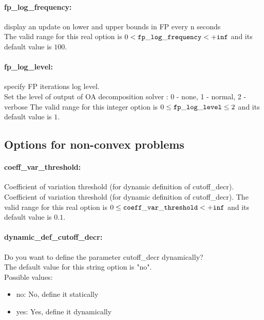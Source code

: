 \paragraph{fp\_log\_frequency:}\label{sec:fp_log_frequency} display an update on lower and upper bounds in FP every n seconds $\;$ \\
 The valid range for this real option is 
$0 <  {\tt fp\_log\_frequency } <  {\tt +inf}$
and its default value is $100$.


\paragraph{fp\_log\_level:}\label{sec:fp_log_level} specify FP iterations log level. $\;$ \\
 Set the level of output of OA decomposition
solver : 0 - none, 1 - normal, 2 - verbose The valid range for this integer option is
$0 \le {\tt fp\_log\_level } \le 2$
and its default value is $1$.


\subsection{Options for non-convex problems}
\label{sec:Options_for_non-convex_problems}
\paragraph{coeff\_var\_threshold:}\label{sec:coeff_var_threshold} Coefficient of variation threshold (for dynamic definition of cutoff\_decr). $\;$ \\
 Coefficient of variation threshold (for dynamic
definition of cutoff\_decr). The valid range for this real option is 
$0 \le {\tt coeff\_var\_threshold } <  {\tt +inf}$
and its default value is $0.1$.


\paragraph{dynamic\_def\_cutoff\_decr:}\label{sec:dynamic_def_cutoff_decr} Do you want to define the parameter cutoff\_decr dynamically? $\;$ \\

The default value for this string option is "no".
\\ 
Possible values:
\begin{itemize}
   \item no: No, define it statically
   \item yes: Yes, define it dynamically
\end{itemize}

